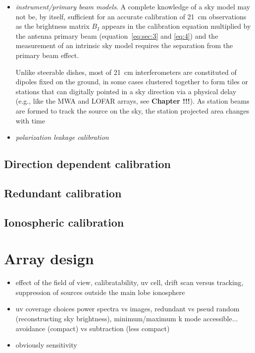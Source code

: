 \begin{itemize}
\item {\it instrument/primary beam models}. A complete knowledge of a sky model may not be, by itself, sufficient for an accurate calibration of 21~cm observations as the brightness matrix $B_I$ appears in the calibration equation multiplied by the antenna primary beam (equation~\ref{eq:sec:3} and \ref{eq:4}) and the measurement of an intrinsic sky model requires the separation from the primary beam effect. 

Unlike steerable dishes, most of 21~cm interferometers are constituted of dipoles fixed on the ground, in some cases clustered together to form tiles or stations that can digitally pointed in a sky direction via a physical delay (e.g., like the MWA and LOFAR arrays, see {\bf Chapter !!!}). As station beams are formed to track the source on the sky, the station projected area changes with time 

\item {\it polarization leakage calibration}
\end{itemize}






\subsection{Direction dependent calibration}

\subsection{Redundant calibration}

\subsection{Ionospheric calibration}

\section{Array design}
\label{sec:design}

\begin{itemize}
\item effect of the field of view, calibratability, uv cell, drift scan versus tracking, suppression of sources outside the main lobe ionosphere
\item uv coverage choices power spectra vs images, redundant vs pseud random (reconstructing sky brightness), minimum/maximum k mode accessible... avoidance (compact) vs subtraction (less compact)
\item obviously sensitivity
\end{itemize}


